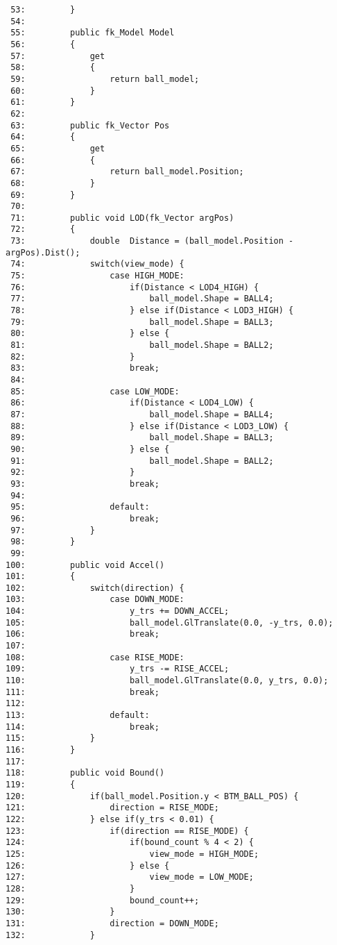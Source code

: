 \begin{breakbox}
\begin{small}
\begin{verbatim}
 53:         }
 54: 
 55:         public fk_Model Model
 56:         {
 57:             get
 58:             {
 59:                 return ball_model;
 60:             }
 61:         }
 62: 
 63:         public fk_Vector Pos
 64:         {
 65:             get
 66:             {
 67:                 return ball_model.Position;
 68:             }
 69:         }
 70: 
 71:         public void LOD(fk_Vector argPos)
 72:         {
 73:             double  Distance = (ball_model.Position - argPos).Dist();
 74:             switch(view_mode) {
 75:                 case HIGH_MODE:
 76:                     if(Distance < LOD4_HIGH) {
 77:                         ball_model.Shape = BALL4;
 78:                     } else if(Distance < LOD3_HIGH) {
 79:                         ball_model.Shape = BALL3;
 80:                     } else {
 81:                         ball_model.Shape = BALL2;
 82:                     }
 83:                     break;
 84: 
 85:                 case LOW_MODE:
 86:                     if(Distance < LOD4_LOW) {
 87:                         ball_model.Shape = BALL4;
 88:                     } else if(Distance < LOD3_LOW) {
 89:                         ball_model.Shape = BALL3;
 90:                     } else {
 91:                         ball_model.Shape = BALL2;
 92:                     }
 93:                     break;
 94: 
 95:                 default:
 96:                     break;
 97:             }
 98:         }
 99: 
100:         public void Accel()
101:         {
102:             switch(direction) {
103:                 case DOWN_MODE:
104:                     y_trs += DOWN_ACCEL;
105:                     ball_model.GlTranslate(0.0, -y_trs, 0.0);
106:                     break;
107: 
108:                 case RISE_MODE:
109:                     y_trs -= RISE_ACCEL;
110:                     ball_model.GlTranslate(0.0, y_trs, 0.0);
111:                     break;
112: 
113:                 default:
114:                     break;
115:             }
116:         }
117: 
118:         public void Bound()
119:         {
120:             if(ball_model.Position.y < BTM_BALL_POS) {
121:                 direction = RISE_MODE;
122:             } else if(y_trs < 0.01) {
123:                 if(direction == RISE_MODE) {
124:                     if(bound_count % 4 < 2) {
125:                         view_mode = HIGH_MODE;
126:                     } else {
127:                         view_mode = LOW_MODE;
128:                     }
129:                     bound_count++;
130:                 }
131:                 direction = DOWN_MODE;
132:             }

\end{verbatim}
\end{small}
\end{breakbox}
